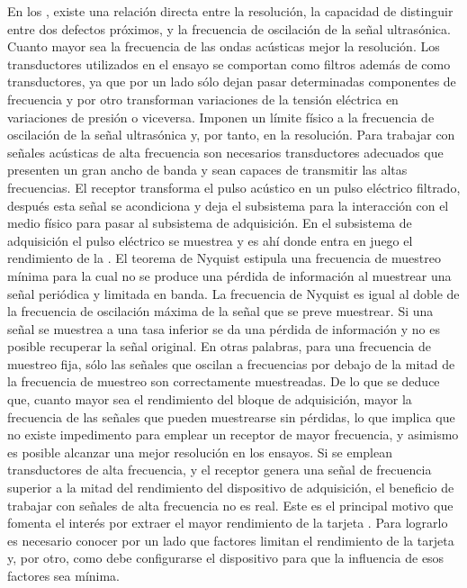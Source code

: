 En los , existe una relación directa entre la resolución, la capacidad de distinguir entre dos defectos próximos, y la frecuencia de oscilación de la señal ultrasónica. Cuanto mayor sea la frecuencia de las ondas acústicas mejor la resolución. Los transductores utilizados en el ensayo se comportan como filtros además de como transductores, ya que por un lado sólo dejan pasar determinadas componentes de frecuencia y por otro transforman variaciones de la tensión eléctrica en variaciones de presión o viceversa. Imponen un límite físico a la frecuencia de oscilación de la señal ultrasónica y, por tanto, en la resolución. Para trabajar con señales acústicas de alta frecuencia son necesarios transductores adecuados que presenten un gran ancho de banda y sean capaces de transmitir las altas frecuencias. El receptor transforma el pulso acústico en un pulso eléctrico filtrado, después esta señal se acondiciona y deja el subsistema para la interacción con el medio físico para pasar al subsistema de adquisición. En el subsistema de adquisición el pulso eléctrico se muestrea y es ahí donde entra en juego el rendimiento de la \kpci{}. El teorema de Nyquist estipula una frecuencia de muestreo mínima para la cual no se produce una pérdida de información al muestrear una señal periódica y limitada en banda. La frecuencia de Nyquist es igual al doble de la frecuencia de oscilación máxima de la señal que se preve muestrear. Si una señal se muestrea a una tasa inferior se da una pérdida de información y no es posible recuperar la señal original. En otras palabras, para una frecuencia de muestreo fija, sólo las señales que oscilan a frecuencias por debajo de la mitad de la frecuencia de muestreo son correctamente muestreadas. De lo que se deduce que, cuanto mayor sea el rendimiento del bloque de adquisición, mayor la frecuencia de las señales que pueden muestrearse sin pérdidas, lo que implica que no existe impedimento para emplear un receptor de mayor frecuencia, y asimismo es posible alcanzar una mejor resolución en los ensayos. Si se emplean transductores de alta frecuencia, y el receptor genera una señal de frecuencia superior a la mitad del rendimiento del dispositivo de adquisición, el beneficio de trabajar con señales de alta frecuencia no es real. Este es el principal motivo que fomenta el interés por extraer el mayor rendimiento de la tarjeta \kpci{}. Para lograrlo es necesario conocer por un lado que factores limitan el rendimiento de la tarjeta y, por otro, como debe configurarse el dispositivo para que la influencia de esos factores sea mínima.


